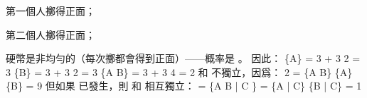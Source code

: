 \startANSWER
\startigBase[A]
\item 第一個人擲得正面；
\item 第二個人擲得正面；
\item 硬幣是非均勻的（每次擲都會得到正面）——概率是 。
\stopigBase
因此：
\startformula\startmathalignment[n=1]
\NC \Pr\{A\} =  3  +  3 \cdot {} 2 =  3 \NR
\NC \Pr\{B\} =  3  +  3 \cdot {} 2 =  3 \NR
\NC \Pr\{A \cap B\} =  3  +  3 \cdot {} 4 =  2 \NR
\stopmathalignment\stopformula
{} 和  不獨立，因爲：
\startformula
{} 2 = \Pr\{A \cap B\} \neq \Pr\{A\} \cdot \Pr\{B\} =  9
\stopformula
但如果  已發生，則  和  相互獨立：
 = \Pr\{A \cap B | C \} = \Pr\{A | C\} \cdot \Pr\{B | C\} = 1
\stopformula
\stopANSWER

\stopsection
